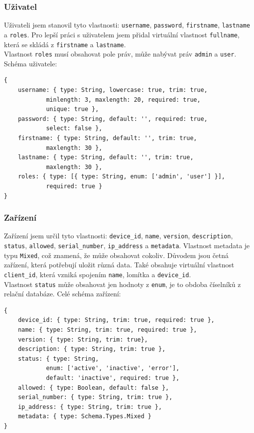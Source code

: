 \documentclass[czech,BP]{thesiskiv}
\begin{document}
	\subsubsection{Uživatel}
Uživateli jsem stanovil tyto vlastnosti: \texttt{username}, \texttt{password}, \texttt{firstname}, \texttt{lastname} a \texttt{roles}. Pro lepší práci s uživatelem jsem přidal virtuální vlastnost \texttt{fullname}, která se skládá z \texttt{firstname} a \texttt{lastname}.\\
Vlastnost \texttt{roles} musí obsahovat pole práv, může nabývat práv \texttt{admin} a \texttt{user}.
Schéma uživatele:
\begin{verbatim}
{
    username: { type: String, lowercase: true, trim: true,
            minlength: 3, maxlength: 20, required: true,
            unique: true },
    password: { type: String, default: '', required: true,
            select: false },
    firstname: { type: String, default: '', trim: true,
            maxlength: 30 },
    lastname: { type: String, default: '', trim: true,
            maxlength: 30 },
    roles: { type: [{ type: String, enum: ['admin', 'user'] }],
            required: true }
}
\end{verbatim}
	
	\subsubsection{Zařízení}

Zařízení jsem určil tyto vlastnosti: \texttt{device\_id}, \texttt{name}, \texttt{version}, \texttt{description}, \texttt{status}, \texttt{allowed}, \texttt{serial\_number}, \texttt{ip\_address} a \texttt{metadata}. 
Vlastnost metadata je typu \texttt{Mixed}, což znamená, že může obsahovat cokoliv.
Důvodem jsou četná zařízení, která potřebují uložit různá data. 
Také obsahuje virtuální vlastnost \texttt{client\_id}, která vzniká spojením \texttt{name}, lomítka a \texttt{device\_id}.\\
Vlastnost \texttt{status} může obsahovat jen hodnoty z \texttt{enum}, je to obdoba číselníků z relační databáze. 
Celé schéma zařízení:

\begin{verbatim}
{
    device_id: { type: String, trim: true, required: true },
    name: { type: String, trim: true, required: true },
    version: { type: String, trim: true},
    description: { type: String, trim: true },
    status: { type: String,
            enum: ['active', 'inactive', 'error'],
            default: 'inactive', required: true },
    allowed: { type: Boolean, default: false },
    serial_number: { type: String, trim: true },
    ip_address: { type: String, trim: true },
    metadata: { type: Schema.Types.Mixed }
}
\end{verbatim}
\end{document}

